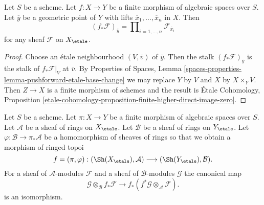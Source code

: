 \begin{lemma}
\label{lemma-stalk-push-finite}
Let $S$ be a scheme. Let $f : X \to Y$ be a finite morphism of algebraic
spaces over $S$. Let $\overline{y}$ be a geometric point of $Y$ with
lifts $\overline{x}_1, \ldots, \overline{x}_n$ in $X$. Then
$$
(f_*\mathcal{F})_{\overline{y}} =
\prod\nolimits_{i = 1, \ldots, n}
\mathcal{F}_{\overline{x}_i}
$$
for any sheaf $\mathcal{F}$ on $X_\etale$.
\end{lemma}

\begin{proof}
Choose an \'etale neighbourhood $(V, \overline{v})$ of $\overline{y}$.
Then the stalk $(f_*\mathcal{F})_{\overline{y}}$
is the stalk of $f_*\mathcal{F}|_V$ at $\overline{v}$.
By Properties of Spaces,
Lemma \ref{spaces-properties-lemma-pushforward-etale-base-change}
we may replace $Y$ by $V$ and $X$ by $X \times_Y V$.
Then $Z \to X$ is a finite morphism of schemes and the result is
\'Etale Cohomology, Proposition
\ref{etale-cohomology-proposition-finite-higher-direct-image-zero}.
\end{proof}

\begin{lemma}
\label{lemma-finite-rings}
Let $S$ be a scheme. Let $\pi : X \to Y$ be a finite morphism of algebraic
spaces over $S$. Let $\mathcal{A}$ be a sheaf of rings on $X_\etale$.
Let $\mathcal{B}$ be a sheaf of rings on $Y_\etale$.
Let $\varphi : \mathcal{B} \to \pi_*\mathcal{A}$
be a homomorphism of sheaves of rings so that we obtain a
morphism of ringed topoi
$$
f = (\pi, \varphi) :
(\Sh(X_\etale), \mathcal{A})
\longrightarrow
(\Sh(Y_\etale), \mathcal{B}).
$$
For a sheaf of $\mathcal{A}$-modules $\mathcal{F}$ and a
sheaf of $\mathcal{B}$-modules $\mathcal{G}$ the canonical map
$$
\mathcal{G} \otimes_\mathcal{B} f_*\mathcal{F}
\longrightarrow
f_*(f^*\mathcal{G} \otimes_\mathcal{A} \mathcal{F}).
$$
is an isomorphism.
\end{lemma}


